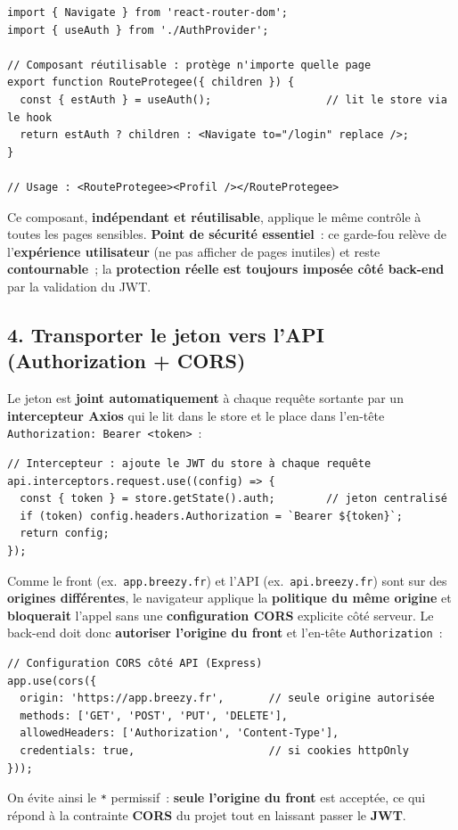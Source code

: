 \begin{verbatim}
import { Navigate } from 'react-router-dom';
import { useAuth } from './AuthProvider';

// Composant réutilisable : protège n'importe quelle page
export function RouteProtegee({ children }) {
  const { estAuth } = useAuth();                  // lit le store via le hook
  return estAuth ? children : <Navigate to="/login" replace />;
}

// Usage : <RouteProtegee><Profil /></RouteProtegee>
\end{verbatim}
\noindent Ce composant, \textbf{indépendant et réutilisable}, applique le même contrôle à toutes les pages sensibles. \textbf{Point de sécurité essentiel}~: ce garde-fou relève de l'\textbf{expérience utilisateur} (ne pas afficher de pages inutiles) et reste \textbf{contournable}~; la \textbf{protection réelle est toujours imposée côté back-end} par la validation du JWT.

\vspace{0.4cm}

\subsection*{4. Transporter le jeton vers l'API (Authorization + CORS)}
{}
\noindent Le jeton est \textbf{joint automatiquement} à chaque requête sortante par un \textbf{intercepteur Axios} qui le lit dans le store et le place dans l'en-tête \texttt{Authorization: Bearer <token>}~:

\begin{verbatim}
// Intercepteur : ajoute le JWT du store à chaque requête
api.interceptors.request.use((config) => {
  const { token } = store.getState().auth;        // jeton centralisé
  if (token) config.headers.Authorization = `Bearer ${token}`;
  return config;
});
\end{verbatim}
\noindent Comme le front (ex.~\texttt{app.breezy.fr}) et l'API (ex.~\texttt{api.breezy.fr}) sont sur des \textbf{origines différentes}, le navigateur applique la \textbf{politique du même origine} et \textbf{bloquerait} l'appel sans une \textbf{configuration CORS} explicite côté serveur. Le back-end doit donc \textbf{autoriser l'origine du front} et l'en-tête \texttt{Authorization}~:

\begin{verbatim}
// Configuration CORS côté API (Express)
app.use(cors({
  origin: 'https://app.breezy.fr',       // seule origine autorisée
  methods: ['GET', 'POST', 'PUT', 'DELETE'],
  allowedHeaders: ['Authorization', 'Content-Type'],
  credentials: true,                     // si cookies httpOnly
}));
\end{verbatim}
\noindent On évite ainsi le \texttt{*} permissif~: \textbf{seule l'origine du front} est acceptée, ce qui répond à la contrainte \textbf{CORS} du projet tout en laissant passer le \textbf{JWT}.

